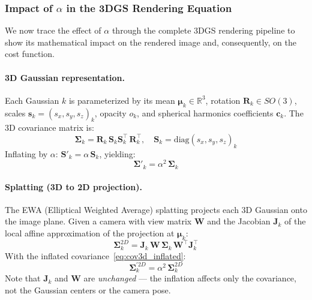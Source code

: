 \documentclass[11pt]{article}
\begin{document}
\subsubsection{Impact of $\alpha$ in the 3DGS Rendering Equation}

We now trace the effect of $\alpha$ through the complete 3DGS rendering pipeline to show its mathematical impact on the rendered image and, consequently, on the cost function.

\paragraph{3D Gaussian representation.}
Each Gaussian $k$ is parameterized by its mean $\boldsymbol{\mu}_k \in \mathbb{R}^3$, rotation $\mathbf{R}_k \in SO(3)$, scales $\mathbf{s}_k = (s_x, s_y, s_z)_k$, opacity $o_k$, and spherical harmonics coefficients $\mathbf{c}_k$. The 3D covariance matrix is:
\begin{equation}
    \boldsymbol{\Sigma}_k = \mathbf{R}_k \, \mathbf{S}_k \mathbf{S}_k^\top \, \mathbf{R}_k^\top, \quad \mathbf{S}_k = \text{diag}(s_x, s_y, s_z)_k
\end{equation}
Inflating by $\alpha$: $\mathbf{S}'_k = \alpha \, \mathbf{S}_k$, yielding:
\begin{equation}
    \boldsymbol{\Sigma}'_k = \alpha^2 \, \boldsymbol{\Sigma}_k
    \label{eq:cov3d_inflated}
\end{equation}

\paragraph{Splatting (3D to 2D projection).}
The EWA (Elliptical Weighted Average) splatting projects each 3D Gaussian onto the image plane. Given a camera with view matrix $\mathbf{W}$ and the Jacobian $\mathbf{J}_k$ of the local affine approximation of the projection at $\boldsymbol{\mu}_k$:
\begin{equation}
    \boldsymbol{\Sigma}_{k}^{2D} = \mathbf{J}_k \, \mathbf{W} \, \boldsymbol{\Sigma}_k \, \mathbf{W}^\top \mathbf{J}_k^\top
\end{equation}
With the inflated covariance~\eqref{eq:cov3d_inflated}:
\begin{equation}
    \boldsymbol{\Sigma}_{k}^{\prime 2D} = \alpha^2 \, \boldsymbol{\Sigma}_{k}^{2D}
    \label{eq:cov2d_inflated}
\end{equation}
Note that $\mathbf{J}_k$ and $\mathbf{W}$ are \emph{unchanged} --- the inflation affects only the covariance, not the Gaussian centers or the camera pose.
\end{document}
